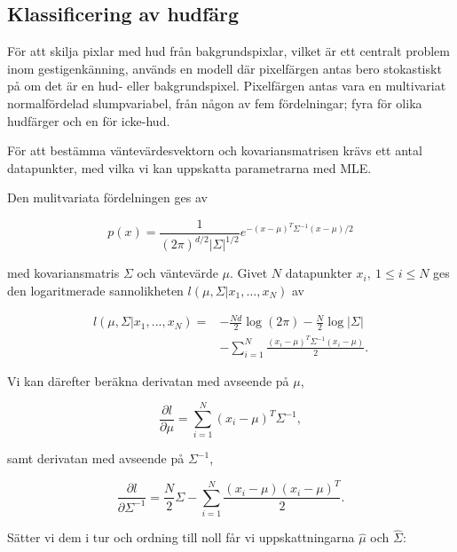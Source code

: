 \documentclass[../rapport_MVEX01-11-05]{subfiles}
\begin{document}
\subsection{Klassificering av hudfärg}

För att skilja pixlar med hud från bakgrundspixlar, vilket är ett
centralt problem inom gestigenkänning, används en modell där pixelfärgen antas
bero stokastiskt på om det är en hud- eller
bakgrundspixel. Pixelfärgen antas vara en multivariat normalfördelad
slumpvariabel, från någon av fem fördelningar; fyra för olika
hudfärger och en för icke-hud.

För att bestämma väntevärdesvektorn och kovariansmatrisen krävs ett
antal datapunkter, med vilka vi kan uppskatta parametrarna med MLE.

Den mulitvariata fördelningen ges av

\begin{equation*}
  p(x)=\frac{1}{(2\pi)^{d/2}|\Sigma|^{1/2}}e^{-(x-\mu)^T\Sigma^{-1}(x-\mu)/2}
\end{equation*}

med kovariansmatris $\Sigma$ och väntevärde $\mu$.
Givet $N$ datapunkter $x_i,\:1\leq i\leq N$ ges den logaritmerade
sannolikheten $l(\mu,\Sigma|x_1,{\ldots} ,x_N)$ av

\begin{equation*}
  \begin{aligned}
  l(\mu,\Sigma|x_1,...,x_N) = &-\frac{Nd}{2}\log(2\pi)-\frac{N}{2}\log|\Sigma|\\
                              &-\sum_{i=1}^N\frac{(x_i-\mu)^T\Sigma^{-1}(x_i-\mu)}{2}.
  \end{aligned}
\end{equation*}

Vi kan därefter beräkna derivatan med avseende på $\mu$,

\begin{equation*}
  \frac{\partial l}{\partial \mu}=\sum_{i=1}^N(x_i-\mu)^T\Sigma^{-1},
\end{equation*}

samt derivatan med avseende på $\Sigma^{-1}$,

\begin{equation*}
  \frac{\partial l}{\partial \Sigma^{-1}}=\frac{N}{2}\Sigma
  -\sum_{i=1}^N\frac{(x_i-\mu)(x_i-\mu)^T}{2}.
\end{equation*}

Sätter vi dem i tur och ordning till noll får vi uppskattningarna $\hat\mu$ och $\hat\Sigma$:
\end{document}
